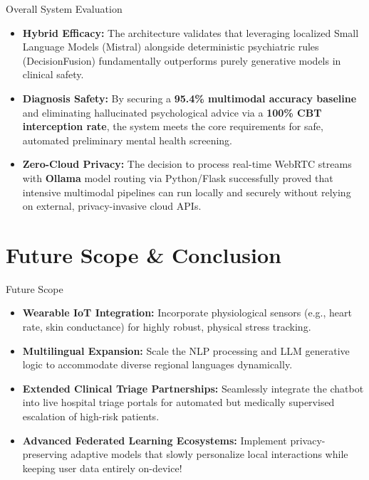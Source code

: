 \documentclass[11pt]{beamer}
\begin{document}
\begin{frame}{Overall System Evaluation}
    \justifying
    \begin{itemize}
        \item \textbf{Hybrid Efficacy:} The architecture validates that leveraging localized Small Language Models (Mistral) alongside deterministic psychiatric rules (DecisionFusion) fundamentally outperforms purely generative models in clinical safety.
        \item \textbf{Diagnosis Safety:} By securing a \textbf{95.4\% multimodal accuracy baseline} and eliminating hallucinated psychological advice via a \textbf{100\% CBT interception rate}, the system meets the core requirements for safe, automated preliminary mental health screening.
        \item \textbf{Zero-Cloud Privacy:} The decision to process real-time WebRTC streams with \textbf{Ollama} model routing via Python/Flask successfully proved that intensive multimodal pipelines can run locally and securely without relying on external, privacy-invasive cloud APIs.
    \end{itemize}
\end{frame}

\section{Future Scope \& Conclusion}

\begin{frame}{Future Scope}
\justifying
\begin{itemize}
    \item \textbf{Wearable IoT Integration:} Incorporate physiological sensors (e.g., heart rate, skin conductance) for highly robust, physical stress tracking.
    \item \textbf{Multilingual Expansion:} Scale the NLP processing and LLM generative logic to accommodate diverse regional languages dynamically.
    \item \textbf{Extended Clinical Triage Partnerships:} Seamlessly integrate the chatbot into live hospital triage portals for automated but medically supervised escalation of high-risk patients.
    \item \textbf{Advanced Federated Learning Ecosystems:} Implement privacy-preserving adaptive models that slowly personalize local interactions while keeping user data entirely on-device!
\end{itemize}
\end{frame}
\end{document}

